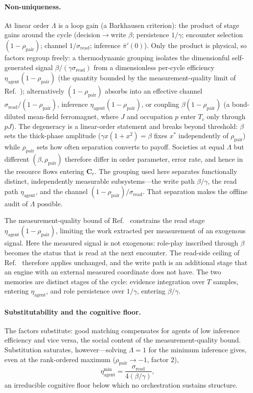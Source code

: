 \documentclass[
  aps,prx,
  preprint,
  superscriptaddress,
  nofootinbib
]{revtex4-2}
\newcommand{\Cr}{\mathbf{C}_r}
\newcommand{\etaag}{\eta_{\mathrm{agent}}}
\newcommand{\rhopair}{\rho_{\mathrm{pair}}}
\newcommand{\sread}{\sigma_{\mathrm{read}}}
\newcommand{\pibar}{\bar\pi}
\begin{document}
\paragraph{Non-uniqueness.} At linear order $\Lambda$ is a loop gain (a Barkhausen criterion): the product of stage gains around the cycle (decision$\to$write $\beta$; persistence $1/\gamma$; encounter selection $(1-\rhopair)$; channel $1/\sread$; inference $\pibar'(0)$). Only the product is physical, so factors regroup freely: a thermodynamic grouping isolates the dimensionful self-generated signal $\beta/(\gamma\sread)$ from a dimensionless per-cycle efficiency $\etaag(1-\rhopair)$ (the quantity bounded by the measurement-quality limit of Ref.~\cite{Castro2026}); alternatively $(1-\rhopair)$ absorbs into an effective channel $\sread/(1-\rhopair)$, inference $\etaag(1-\rhopair)$, or coupling $\beta(1-\rhopair)$ (a bond-diluted mean-field ferromagnet, where $J$ and occupation $p$ enter $T_c$ only through $pJ$). The degeneracy is a linear-order statement and breaks beyond threshold: $\beta$ sets the thick-phase amplitude ($\gamma x(1+x^2)=\beta$ fixes $x^*$ independently of $\rhopair$) while $\rhopair$ sets how often separation converts to payoff. Societies at equal $\Lambda$ but different $(\beta,\rhopair)$ therefore differ in order parameter, error rate, and hence in the resource flows entering $\Cr$. The grouping used here separates functionally distinct, independently measurable subsystems---the write path $\beta/\gamma$, the read path $\etaag$, and the channel $(1-\rhopair)/\sread$. That separation makes the offline audit of $\Lambda$ possible.

The measurement-quality bound of Ref.~\cite{Castro2026} constrains the read stage $\etaag(1-\rhopair)$, limiting the work extracted per measurement of an exogenous signal. Here the measured signal is not exogenous: role-play inscribed through $\beta$ becomes the status that is read at the next encounter. The read-side ceiling of Ref.~\cite{Castro2026} therefore applies unchanged, and the write path is an additional stage that an engine with an external measured coordinate does not have. The two memories are distinct stages of the cycle: evidence integration over $T$ samples, entering $\etaag$, and role persistence over $1/\gamma$, entering $\beta/\gamma$.

\paragraph{Substitutability and the cognitive floor.} The factors substitute: good matching compensates for agents of low inference efficiency and vice versa, the social content of the measurement-quality bound. Substitution saturates, however---solving $\Lambda=1$ for the minimum inference gives, even at the rank-ordered maximum ($\rhopair\to-1$, factor $2$),
\begin{equation}\label{SM-eq:sm-floor}
\etaag^{\min}=\frac{\sread}{4(\beta/\gamma)},
\end{equation}
an irreducible cognitive floor below which no orchestration sustains structure.
\end{document}
